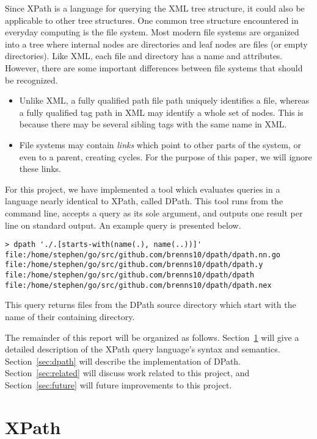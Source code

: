 \documentclass{scrartcl}
\begin{document}
Since XPath is a language for querying the XML tree structure, it could also be
applicable to other tree structures. One common tree structure encountered in
everyday computing is the file system. Most modern file systems are organized
into a tree where internal nodes are directories and leaf nodes are files (or
empty directories). Like XML, each file and directory has a name and attributes.
However, there are some important differences between file systems that should
be recognized.

\begin{itemize}
\item Unlike XML, a fully qualified path file path uniquely identifies a file,
  whereas a fully qualified tag path in XML may identify a whole set of nodes.
  This is because there may be several sibling tags with the same name in XML.
\item File systems may contain \emph{links} which point to other parts of the
  system, or even to a parent, creating cycles. For the purpose of this paper,
  we will ignore these links.
\end{itemize}

For this project, we have implemented a tool which evaluates queries in a
language nearly identical to XPath, called DPath. This tool runs from the
command line, accepts a query as its sole argument, and outputs one result per
line on standard output. An example query is presented below.

\begin{lstlisting}
> dpath './.[starts-with(name(.), name(..))]'
file:/home/stephen/go/src/github.com/brenns10/dpath/dpath.nn.go
file:/home/stephen/go/src/github.com/brenns10/dpath/dpath.y
file:/home/stephen/go/src/github.com/brenns10/dpath/dpath
file:/home/stephen/go/src/github.com/brenns10/dpath/dpath.nex
\end{lstlisting}

This query returns files from the DPath source directory which start with the
name of their containing directory.

The remainder of this report will be organized as follows.
Section~\ref{sec:xpath} will give a detailed description of the XPath query
language's syntax and semantics. Section~\ref{sec:dpath} will describe the
implementation of DPath. Section~\ref{sec:related} will discuss work related to
this project, and Section~\ref{sec:future} will future improvements to this
project.

\section{XPath}
\label{sec:xpath}
\end{document}
